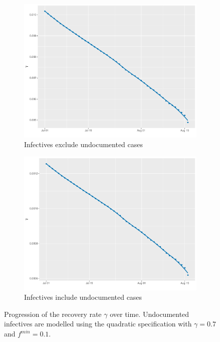 \documentclass[12pt]{article}
\begin{document}
\begin{appendices}
		\begin{figure}[H]
    	    \centering
    	    \begin{subfigure}{0.495\textwidth}
    	      \centering
    	      \includegraphics[width=\linewidth]{output/panel_data_lag14_gammas_rolling.pdf}
    	      \caption{Infectives exclude undocumented cases}
    	      \label{fig:gamma_over_time_panel_data}
    	    \end{subfigure}
    	    \begin{subfigure}{0.495\textwidth}
    	      \centering
    	      \includegraphics[width=\linewidth]{output/panel_data_lag14_gammas_UndocQuadratic_rolling.pdf}
    	      \caption{Infectives include undocumented cases}
    	      \label{fig:gamma_over_time_panel_data_undoc_rolling}
    	    \end{subfigure}
    	    \caption{Progression of the recovery rate $\gamma$ over time. Undocumented infectives are modelled using the quadratic specification with $\gamma = 0.7$ and $f^{min}=0.1$.}
    	    \label{fig:gamma_over_time_panel_data_all}
    	\end{figure}
		

\end{appendices}
\end{document}
